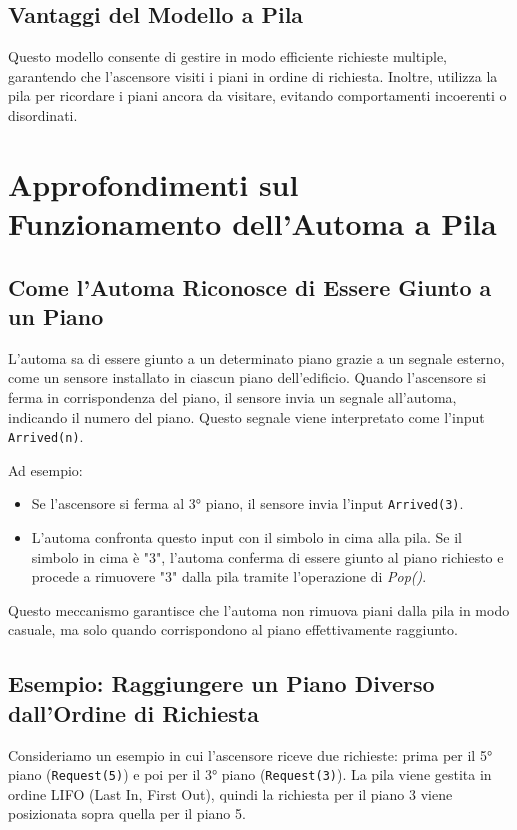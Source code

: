 \documentclass[a4paper,12pt]{report}
\begin{document}
\subsection*{Vantaggi del Modello a Pila}
Questo modello consente di gestire in modo efficiente richieste multiple, garantendo che l'ascensore visiti i piani in ordine di richiesta. Inoltre, utilizza la pila per ricordare i piani ancora da visitare, evitando comportamenti incoerenti o disordinati.

\section*{Approfondimenti sul Funzionamento dell'Automa a Pila}

\subsection*{Come l'Automa Riconosce di Essere Giunto a un Piano}
L'automa sa di essere giunto a un determinato piano grazie a un segnale esterno, come un sensore installato in ciascun piano dell'edificio. Quando l'ascensore si ferma in corrispondenza del piano, il sensore invia un segnale all'automa, indicando il numero del piano. Questo segnale viene interpretato come l'input \texttt{Arrived(n)}.

Ad esempio:
\begin{itemize}
    \item Se l'ascensore si ferma al 3° piano, il sensore invia l'input \texttt{Arrived(3)}.
    \item L'automa confronta questo input con il simbolo in cima alla pila. Se il simbolo in cima è "3", l'automa conferma di essere giunto al piano richiesto e procede a rimuovere "3" dalla pila tramite l'operazione di \textit{Pop()}.
\end{itemize}

Questo meccanismo garantisce che l'automa non rimuova piani dalla pila in modo casuale, ma solo quando corrispondono al piano effettivamente raggiunto.

\subsection*{Esempio: Raggiungere un Piano Diverso dall'Ordine di Richiesta}
Consideriamo un esempio in cui l'ascensore riceve due richieste: prima per il 5° piano (\texttt{Request(5)}) e poi per il 3° piano (\texttt{Request(3)}). La pila viene gestita in ordine LIFO (Last In, First Out), quindi la richiesta per il piano 3 viene posizionata sopra quella per il piano 5.
\end{document}
